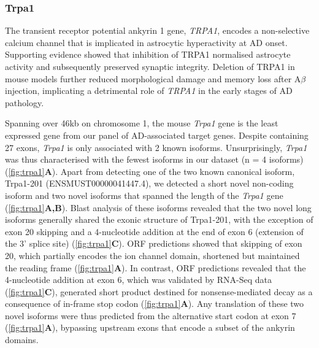 \newpage
\subsubsection{Trpa1}
The transient receptor potential ankyrin 1 gene, \textit{TRPA1}, encodes a non-selective calcium channel that is implicated in astrocytic hyperactivity at AD onset\cite{Payrits2020}. Supporting evidence showed that inhibition of TRPA1 normalised astrocyte activity and subsequently preserved synaptic integrity\cite{Lee2016a}. Deletion of TRPA1 in mouse models further reduced morphological damage and memory loss after A$\beta$ injection, implicating a detrimental role of \textit{TRPA1} in the early stages of AD pathology.\cite{Payrits2020}

Spanning over 46kb on chromosome 1, the mouse \textit{Trpa1} gene is the least expressed gene  from our panel of AD-associated target genes. Despite containing 27 exons, \textit{Trpa1} is only associated with 2 known isoforms. Unsurprisingly, \textit{Trpa1} was thus characterised with the fewest isoforms in our dataset (n = 4 isoforms) (\cref{fig:trpa1}\textbf{A}). Apart from detecting one of the two known canonical isoform, Trpa1-201 (ENSMUST00000041447.4), we detected a short novel non-coding isoform and two novel isoforms that spanned the length of the \textit{Trpa1} gene (\cref{fig:trpa1}\textbf{A,B}). Blast analysis of these isoforms revealed that the two novel long isoforms generally shared the exonic structure of Trpa1-201, with the exception of exon 20 skipping and a 4-nucleotide addition at the end of exon 6 (extension of the 3' splice site) (\cref{fig:trpa1}\textbf{C}). ORF predictions showed that skipping of exon 20, which partially encodes the ion channel domain, shortened but maintained the reading frame (\cref{fig:trpa1}\textbf{A}). In contrast, ORF predictions revealed that the 4-nucleotide addition at exon 6, which was validated by RNA-Seq data (\cref{fig:trpa1}\textbf{C}), generated short product destined for nonsense-mediated decay as a consequence of in-frame stop codon (\cref{fig:trpa1}\textbf{A}). Any translation of these two novel isoforms were thus predicted from the alternative start codon at exon 7 (\cref{fig:trpa1}\textbf{A}), bypassing upstream exons that encode a subset of the ankyrin domains.     

